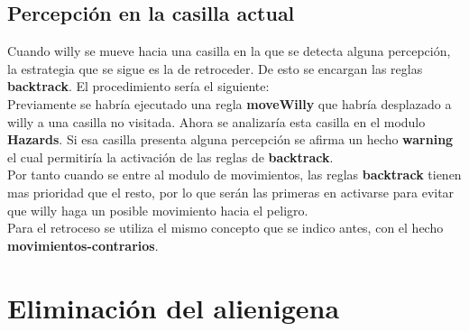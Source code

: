 \documentclass[a4paper,10pt]{article}
\begin{document}
\subsection{Percepción en la casilla actual}
Cuando willy se mueve hacia una casilla en la que se detecta alguna percepción, la estrategia que se sigue es la de retroceder. De esto se encargan las reglas {\bf backtrack}. El procedimiento sería el siguiente:
\vspace{0.5 cm}\\
Previamente se habría ejecutado una regla {\bf moveWilly} que habría desplazado a willy a una casilla no visitada. Ahora se analizaría esta casilla en el modulo {\bf Hazards}. Si esa casilla presenta alguna percepción se afirma un hecho {\bf warning} el cual permitiría la activación de las reglas de {\bf backtrack}.
\vspace{0.5 cm}\\
Por tanto cuando se entre al modulo de movimientos, las reglas {\bf backtrack} tienen mas prioridad que el resto, por lo que serán las primeras en activarse para evitar que willy haga un posible movimiento hacia el peligro.
\vspace{0.5 cm}\\
Para el retroceso se utiliza el mismo concepto que se indico antes, con el hecho {\bf movimientos-contrarios}.
\pagebreak



\section{Eliminación del alienigena}
\end{document}
